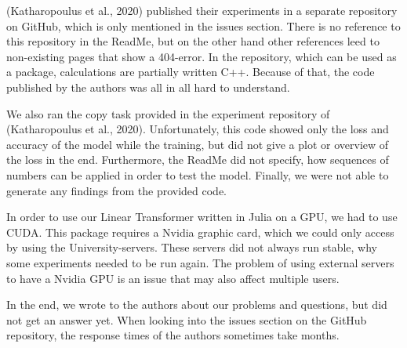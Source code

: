 \documentclass[DIV=13,fontsize=11pt]{scrartcl}
\begin{document}
(Katharopoulus et al., 2020) published their experiments in a separate repository on GitHub, which is only mentioned in the issues section. There is no reference to this repository in the ReadMe, but on the other hand other references leed to non-existing pages that show a 404-error. In the repository, which can be used as a package, calculations are partially written C++. Because of that, the code published by the authors was all in all hard to understand. 

We also ran the copy task provided in the experiment repository of (Katharopoulus et al., 2020). Unfortunately, this code showed only the loss and accuracy of the model while the training, but did not give a plot or overview of the loss in the end. Furthermore, the ReadMe did not specify, how sequences of numbers can be applied in order to test the model. Finally, we were not able to generate any findings from the provided code.

In order to use our Linear Transformer written in Julia on a GPU, we had to use CUDA. This package requires a Nvidia graphic card, which we could only access by using the University-servers. These servers did not always run stable, why some experiments needed to be run again. The problem of using external servers to have a Nvidia GPU is an issue that may also affect multiple users.

In the end, we wrote to the authors about our problems and questions, but did not get an answer yet. When looking into the issues section on the GitHub repository, the response times of the authors sometimes take months. 



\end{document}
